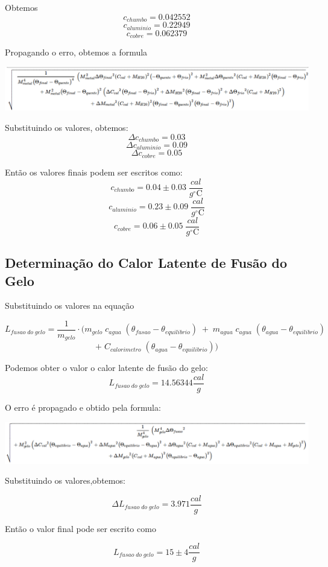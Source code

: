 \documentclass[12pt,a4paper]{article}
\begin{document}
Obtemos 
$$ c_{chumbo} = 0.042552 $$
$$ c_{aluminio} = 0.22949 $$
$$ c_{cobre} = 0.062379 $$

Propagando o erro, obtemos a formula 

\includegraphics[scale=0.45]{formula.png}

Substituindo os valores, obtemos:
$$ \Delta c_{chumbo} = 0.03 $$
$$ \Delta c_{aluminio} = 0.09 $$
$$ \Delta c_{cobre} = 0.05 $$

Então os valores finais podem ser escritos como:
$$ c_{chumbo} = 0.04 \pm 0.03 \; \dfrac{cal}{g^{\circ}\mathrm{C}}$$
$$ c_{aluminio} = 0.23 \pm 0.09 \; \dfrac{cal}{g^{\circ}\mathrm{C}}$$
$$ c_{cobre} = 0.06 \pm 0.05 \; \dfrac{cal}{g^{\circ}\mathrm{C}}$$


\subsection{Determinação do Calor Latente de Fusão do Gelo}
Substituindo os valores na equação 

$$L_{fusao\;do\;gelo} = \frac{1}{m_{gelo}} \cdot (m_{gelo} \; c_{agua} \; (\theta_{fusao} - \theta_{equilibrio}) \; + \; m_{agua} \; c_{agua} \; (\theta_{agua} - \theta_{equilibrio}) \;$$ 
$$ + \; C_{calorimetro} \; (\theta_{agua} - \theta_{equilibrio}))$$

Podemos obter o valor o calor latente de fusão do gelo:
$$ L_{fusao\;do\;gelo} = 14.56344 \dfrac{cal}{g}$$

O erro é propagado e obtido pela formula: 

\includegraphics[scale=0.45]{formula2.png}

Substituindo os valores,obtemos:

$$ \Delta L_{fusao\;do\;gelo} = 3.971 \dfrac{cal}{g}$$

Então o valor final pode ser escrito como

$$ L_{fusao\;do\;gelo} = 15 \pm 4 \dfrac{cal}{g}$$
\end{document}
